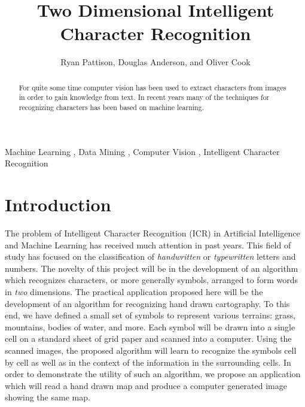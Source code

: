 \documentclass[preprint,3p,12pt]{elsarticle}
\begin{document}
\begin{frontmatter}

\title{Two Dimensional Intelligent Character Recognition}


\author[ryan,doug,oliver]{Ryan Pattison, Douglas Anderson, and Oliver Cook}
\address[ryan]{ryan.m.pattison@gmail.com}
\address[doug]{dander01@uoguelph.ca}
\address[oliver]{cooko@uoguelph.ca}


\begin{abstract}

For quite some time computer vision has been used to extract characters from
images in order to gain knowledge from text. In recent years many of the
techniques for recognizing characters has been based on machine learning.

\end{abstract}

\begin{keyword}
Machine Learning \sep
Data Mining \sep
Computer Vision \sep
Intelligent Character Recognition


\end{keyword}

\end{frontmatter}


\section{Introduction}
\label{intro}
The problem of Intelligent Character Recognition (ICR) in Artificial Intelligence
and Machine Learning has received much attention in past years. This field of study has focused
on the classification of \emph{handwritten}  or \emph{typewritten} letters and numbers.
The novelty of this project will be in the
development of an algorithm which recognizes characters, or more generally
symbols, arranged to form words in \emph{two} dimensions. The practical
application proposed here will be the development of an algorithm for
recognizing hand drawn cartography. To this end, we have defined a small set of
symbols to represent various terrains: grass, mountains, bodies of water, and
more. Each symbol will be drawn into a single cell on a standard sheet of grid
paper and scanned into a computer. Using the scanned images, the proposed
algorithm will learn to recognize the symbols cell by cell as well as in the
context of the information in the surrounding cells. In order to demonstrate
the utility of such an algorithm, we propose an application which will read a
hand drawn map and produce a computer generated image showing the same map.
\end{document}

